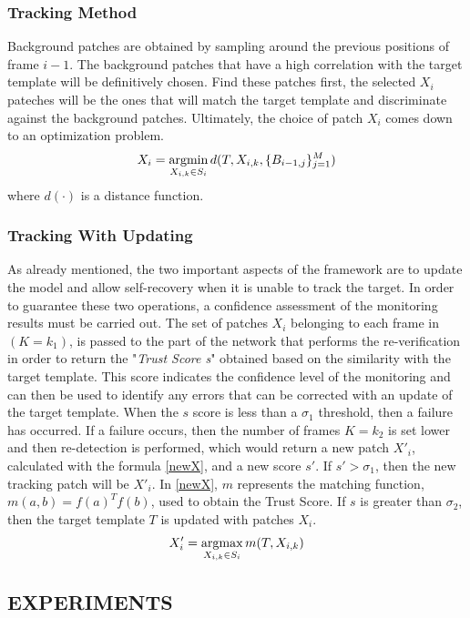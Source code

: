 \subsubsection{Tracking Method}
Background patches are obtained by sampling around the previous positions 
of frame $i-1$. The background patches that have a high correlation with 
the target template will be definitively chosen. Find these patches first, the 
selected $X_i$ pateches will be the ones that will match the target template and 
discriminate against the background patches. Ultimately, the choice of 
patch $X_i$ comes down to an optimization problem.
\begin{equation}
    X_i = \operatorname*{argmin}_{X_{i,k} \in S_i}d(T,X_{i,k}, \{B_{i-1,j}\}^M_{j=1})
\end{equation}
where $d(\cdot)$ is a distance function.

\subsubsection{Tracking With Updating}
As already mentioned, the two important aspects of the framework are to 
update the model and allow self-recovery when it is unable to track the target. 
In order to guarantee these two operations, a confidence assessment of the 
monitoring results must be carried out. The set of patches $X_i$ belonging to 
each frame in $(K = k_1)$, is passed to the part of the network that performs 
the re-verification in order to return the "\emph{Trust Score s}" obtained based on 
the similarity with the target template. This score indicates the confidence 
level of the monitoring and can then be used to identify any errors that can 
be corrected with an update of the target template. When the $s$ score is less 
than a $\sigma_1$ threshold, then a failure has occurred. If a failure occurs, then the 
number of frames $K = k_2$ is set lower and then re-detection is performed, 
which would return a new patch $X'_i$, calculated with the formula \ref{newX}, and a 
new score $s'$. If $s'> \sigma_1$, then the new tracking patch will be $X'_i$. In \ref{newX}, $m$ 
represents the matching function, $m(a,b)=f(a)^Tf(b)$, used to obtain 
the Trust Score. If $s$ is greater than $\sigma_2$, then the target template $T$ is updated 
with patches $X_i$.
\begin{equation}\label{newX}
    X'_i = \operatorname*{argmax}_{X_{i,k} \in S_i}m(T,X_{i,k})
\end{equation}

\subsection{EXPERIMENTS}
